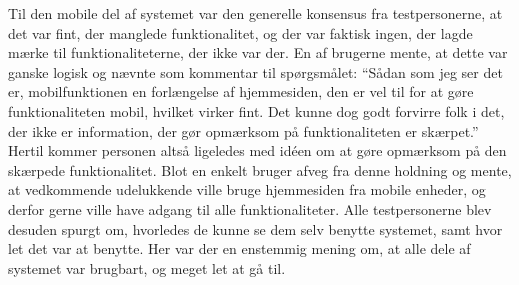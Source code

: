 Til den mobile del af systemet var den generelle konsensus fra testpersonerne, at det var fint, der manglede funktionalitet, og der var faktisk ingen, der lagde mærke til funktionaliteterne, der ikke var der. 
En af brugerne mente, at dette var ganske logisk og nævnte som kommentar til spørgsmålet: ``Sådan som jeg ser det er, mobilfunktionen en forlængelse af hjemmesiden, den er vel til for at gøre funktionaliteten mobil, hvilket virker fint. 
Det kunne dog godt forvirre folk i det, der ikke er information, der gør opmærksom på funktionaliteten er skærpet.''
Hertil kommer personen altså ligeledes med idéen om at gøre opmærksom på den skærpede funktionalitet.
Blot en enkelt bruger afveg fra denne holdning og mente, at vedkommende udelukkende ville bruge hjemmesiden fra mobile enheder, og derfor gerne ville have adgang til alle funktionaliteter.
Alle testpersonerne blev desuden spurgt om, hvorledes de kunne se dem selv benytte systemet, samt hvor let det var at benytte.
Her var der en enstemmig mening om, at alle dele af systemet var brugbart, og meget let at gå til.
